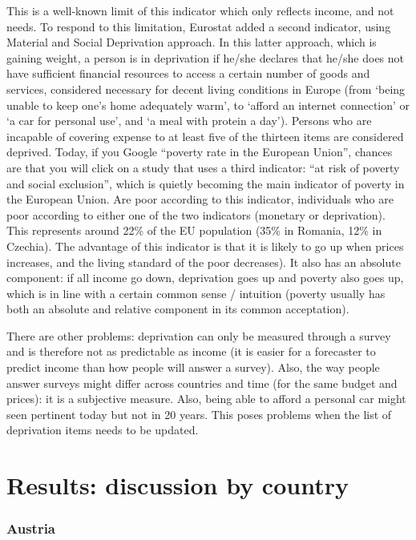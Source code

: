 \documentclass[
  9pt,
  a4paper,
  DIV=11,
  numbers=noendperiod,
  oneside]{scrartcl}
\begin{document}
\begin{tcolorbox}[enhanced jigsaw, arc=.35mm, leftrule=.75mm, left=2mm, bottomrule=.15mm, rightrule=.15mm, colframe=quarto-callout-note-color-frame, toprule=.15mm, colback=white, opacityback=0, breakable]
This is a well-known limit of this indicator which only reflects income,
and not needs. To respond to this limitation, Eurostat added a second
indicator, using Material and Social Deprivation approach. In this
latter approach, which is gaining weight, a person is in deprivation if
he/she declares that he/she does not have sufficient financial resources
to access a certain number of goods and services, considered necessary
for decent living conditions in Europe (from `being unable to keep one's
home adequately warm', to `afford an internet connection' or `a car for
personal use', and `a meal with protein a day'). Persons who are
incapable of covering expense to at least five of the thirteen items are
considered deprived. Today, if you Google ``poverty rate in the European
Union'', chances are that you will click on a study that uses a third
indicator: ``at risk of poverty and social exclusion'', which is quietly
becoming the main indicator of poverty in the European Union. Are poor
according to this indicator, individuals who are poor according to
either one of the two indicators (monetary or deprivation). This
represents around 22\% of the EU population (35\% in Romania, 12\% in
Czechia). The advantage of this indicator is that it is likely to go up
when prices increases, and the living standard of the poor decreases).
It also has an absolute component: if all income go down, deprivation
goes up and poverty also goes up, which is in line with a certain common
sense / intuition (poverty usually has both an absolute and relative
component in its common acceptation).

There are other problems: deprivation can only be measured through a
survey and is therefore not as predictable as income (it is easier for a
forecaster to predict income than how people will answer a survey).
Also, the way people answer surveys might differ across countries and
time (for the same budget and prices): it is a subjective measure. Also,
being able to afford a personal car might seen pertinent today but not
in 20 years. This poses problems when the list of deprivation items
needs to be updated.
\end{tcolorbox}

\hypertarget{results-discussion-by-country}{%
\section{Results: discussion by
country}\label{results-discussion-by-country}}

\hypertarget{austria}{%
\subsubsection{Austria}\label{austria}}
\end{document}
